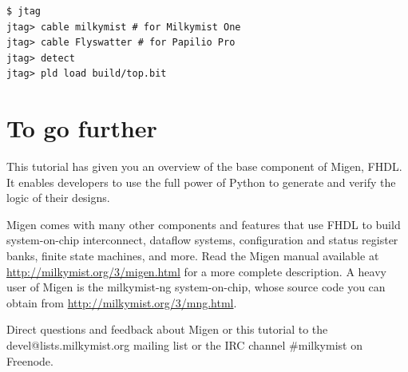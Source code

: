 \documentclass[11pt]{paper}
\begin{document}
\begin{verbatim}
$ jtag
jtag> cable milkymist # for Milkymist One
jtag> cable Flyswatter # for Papilio Pro
jtag> detect
jtag> pld load build/top.bit
\end{verbatim}

\section{To go further}
This tutorial has given you an overview of the base component of Migen, FHDL. It enables developers to use the full power of Python to generate and verify the logic of their designs.

Migen comes with many other components and features that use FHDL to build system-on-chip interconnect, dataflow systems, configuration and status register banks, finite state machines, and more. Read the Migen manual available at \url{http://milkymist.org/3/migen.html} for a more complete description. A heavy user of Migen is the milkymist-ng system-on-chip, whose source code you can obtain from \url{http://milkymist.org/3/mng.html}.

Direct questions and feedback about Migen or this tutorial to the devel@lists.milkymist.org mailing list or the IRC channel \#milkymist on Freenode.
\end{document}
